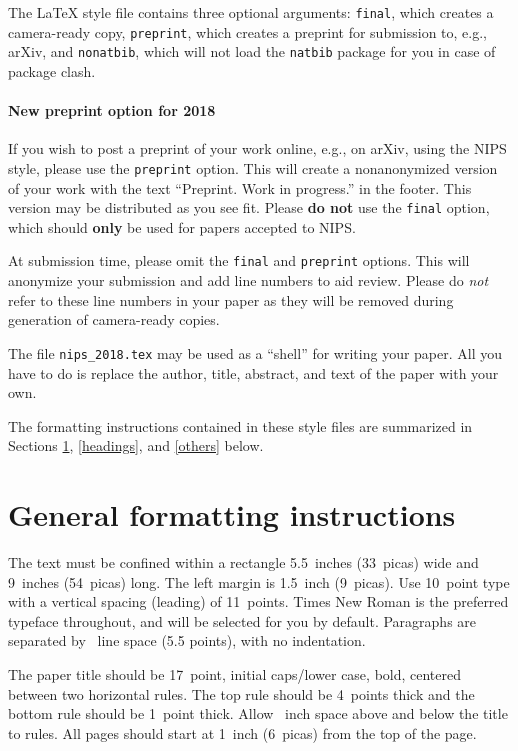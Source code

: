 \documentclass{article}
\begin{document}
The \LaTeX{} style file contains three optional arguments: \verb+final+,
which creates a camera-ready copy, \verb+preprint+, which creates a
preprint for submission to, e.g., arXiv, and \verb+nonatbib+, which will
not load the \verb+natbib+ package for you in case of package clash.

\paragraph{New preprint option for 2018}
If you wish to post a preprint of your work online, e.g., on arXiv,
using the NIPS style, please use the \verb+preprint+ option. This will
create a nonanonymized version of your work with the text
``Preprint. Work in progress.''  in the footer. This version may be
distributed as you see fit. Please \textbf{do not} use the
\verb+final+ option, which should \textbf{only} be used for papers
accepted to NIPS.

At submission time, please omit the \verb+final+ and \verb+preprint+
options. This will anonymize your submission and add line numbers to aid
review. Please do \emph{not} refer to these line numbers in your paper
as they will be removed during generation of camera-ready copies.

The file \verb+nips_2018.tex+ may be used as a ``shell'' for writing
your paper. All you have to do is replace the author, title, abstract,
and text of the paper with your own.

The formatting instructions contained in these style files are
summarized in Sections \ref{gen_inst}, \ref{headings}, and
\ref{others} below.

\section{General formatting instructions}
\label{gen_inst}

The text must be confined within a rectangle 5.5~inches (33~picas)
wide and 9~inches (54~picas) long. The left margin is 1.5~inch
(9~picas).  Use 10~point type with a vertical spacing (leading) of
11~points.  Times New Roman is the preferred typeface throughout, and
will be selected for you by default.  Paragraphs are separated by
~line space (5.5 points), with no indentation.

The paper title should be 17~point, initial caps/lower case, bold,
centered between two horizontal rules. The top rule should be 4~points
thick and the bottom rule should be 1~point thick. Allow
~inch space above and below the title to rules. All
pages should start at 1~inch (6~picas) from the top of the page.
\end{document}
